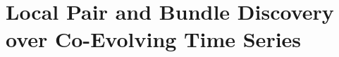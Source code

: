 \section{Local Pair and Bundle Discovery over Co-Evolving Time Series}\label{chap:3_2}

\graphicspath{{SSTD2019/}}






